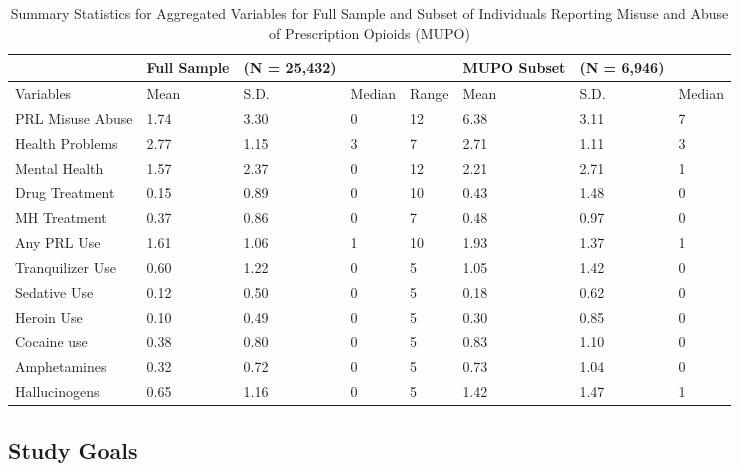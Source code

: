 \documentclass[sigconf]{acmart}
\begin{document}
\begin{table*}[ht]
  \caption{Summary Statistics for Aggregated Variables for Full Sample and 
  Subset of Individuals Reporting Misuse and Abuse of Prescription Opioids (MUPO)}
  \label{tab:freq}
  \begin{tabular}{llllllll}
    \toprule
     & Full Sample& (N = 25,432)&&& MUPO Subset& (N = 6,946)&  \\
    \midrule
    Variables & Mean& S.D.& Median& Range& Mean& S.D.& Median  \\
    \midrule
    PRL Misuse Abuse& 1.74& 3.30& 0& 12& 6.38& 3.11 & 7 \\
    Health Problems& 2.77& 1.15& 3& 7& 2.71& 1.11& 3  \\
    Mental Health& 1.57& 2.37& 0& 12& 2.21& 2.71& 1  \\
    Drug Treatment& 0.15& 0.89& 0& 10& 0.43& 1.48& 0  \\
    MH Treatment& 0.37& 0.86& 0& 7& 0.48& 0.97& 0  \\
    Any PRL Use& 1.61& 1.06& 1& 10& 1.93& 1.37& 1 \\
    Tranquilizer Use& 0.60& 1.22& 0& 5& 1.05& 1.42& 0  \\
    Sedative Use& 0.12& 0.50& 0& 5& 0.18& 0.62& 0  \\
    Heroin Use& 0.10& 0.49& 0& 5& 0.30& 0.85& 0  \\
    Cocaine use& 0.38& 0.80& 0& 5& 0.83& 1.10& 0 \\
    Amphetamines& 0.32& 0.72& 0& 5& 0.73& 1.04& 0  \\
    Hallucinogens& 0.65& 1.16& 0& 5& 1.42& 1.47& 1  \\
    \bottomrule
  \end{tabular}
\end{table*}

\subsection{Study Goals} 
\end{document}

